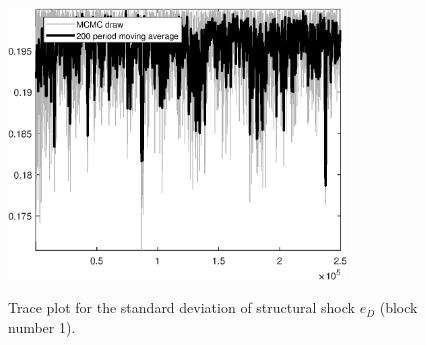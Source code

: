 \begin{figure}[H]
\centering
  \includegraphics[width=0.8\textwidth]{BRS/graphs/TracePlot_SE_e_D_blck_1}\\
    \caption{Trace plot for the standard deviation of structural shock ${e_D}$ (block number 1).}
\end{figure}

